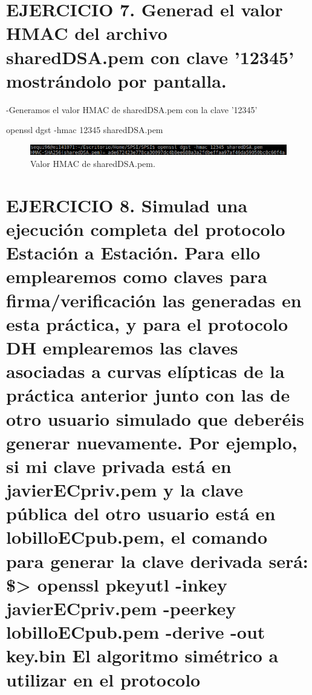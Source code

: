\section{EJERCICIO 7. Generad el valor HMAC del archivo sharedDSA.pem con clave ’12345’ mostrándolo por pantalla. }

-Generamos el valor HMAC de sharedDSA.pem con la clave '12345'

openssl dgst -hmac 12345 sharedDSA.pem

\begin{figure}[h]
	\centering
	\includegraphics[width=1\textwidth]{imagenes/generacionHMAC}
	\caption{Valor HMAC de sharedDSA.pem.}
\end{figure}










\section{EJERCICIO 8. Simulad una ejecución completa del protocolo Estación a Estación. Para ello emplearemos como claves para firma/verificación las generadas en esta práctica, y para el protocolo DH emplearemos las claves asociadas a curvas elípticas de la práctica anterior junto con las de otro usuario simulado que deberéis generar nuevamente. Por ejemplo, si mi clave privada está en javierECpriv.pem y la clave pública del otro usuario está en lobilloECpub.pem, el comando para generar la clave derivada será: \$> openssl pkeyutl -inkey javierECpriv.pem -peerkey lobilloECpub.pem -derive -out key.bin El algoritmo simétrico a utilizar en el protocolo}


